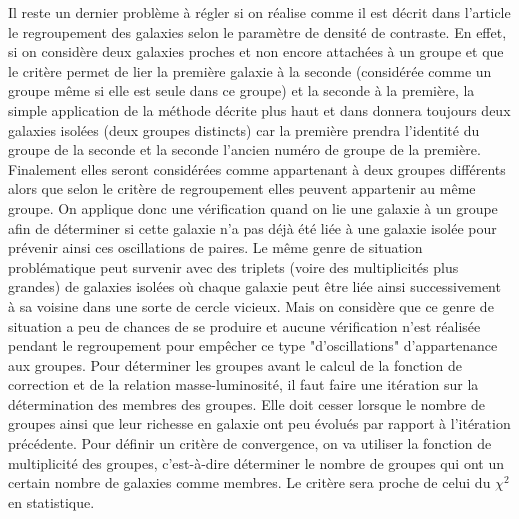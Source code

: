 Il reste un dernier problème à régler si on réalise comme il est décrit dans l'article le regroupement des galaxies selon le
paramètre de densité de contraste. En effet, si on considère deux galaxies proches et non encore attachées à un groupe et que le
critère permet de lier la première galaxie à la seconde (considérée comme un groupe même si elle est seule dans ce groupe) et la
seconde à la première, la simple application de la méthode décrite plus haut et dans \citet{Yang+07} donnera toujours deux galaxies
isolées (deux groupes distincts) car la première prendra l'identité du groupe de la seconde et la seconde l'ancien numéro de groupe
de la première. Finalement elles seront considérées comme appartenant à deux groupes différents alors que selon le critère de
regroupement elles peuvent appartenir au même groupe. On applique donc une vérification quand on lie une galaxie à un groupe afin
de déterminer si cette galaxie n'a pas déjà été liée à une galaxie isolée pour prévenir ainsi ces oscillations de paires. Le même
genre de situation problématique peut survenir avec des triplets (voire des multiplicités plus grandes) de galaxies isolées où
chaque galaxie peut être liée ainsi successivement à sa voisine dans une sorte de cercle vicieux. Mais on considère que ce genre de
situation a peu de chances de se produire et aucune vérification n'est réalisée pendant le regroupement pour empêcher ce type
"d'oscillations" d'appartenance aux groupes.
Pour déterminer les groupes avant le calcul de la fonction de correction et de la relation masse-luminosité, il faut faire une
itération sur la détermination des membres des groupes. Elle doit cesser lorsque le nombre de groupes ainsi que leur richesse en
galaxie ont peu évolués par rapport à l'itération précédente. Pour définir un critère de convergence, on va utiliser la fonction de
multiplicité des groupes, c'est-à-dire déterminer le nombre de groupes qui ont un certain nombre de galaxies comme membres. Le
critère sera proche de celui du $\chi^2$ en statistique.

